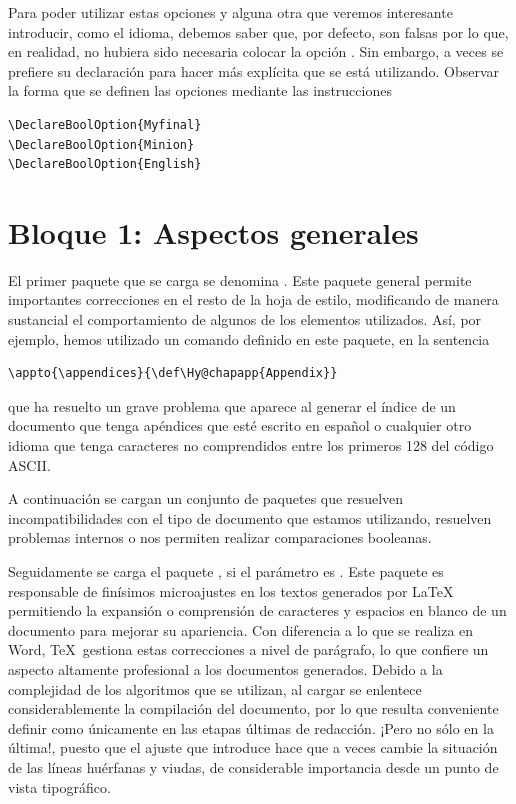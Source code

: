 Para poder utilizar estas opciones y alguna otra que veremos interesante introducir, como el idioma, debemos saber que, por defecto, son falsas por lo que, en realidad, no hubiera sido necesaria colocar la opción . Sin embargo, a veces se prefiere su declaración para hacer más explícita que se está utilizando. Observar la forma que se definen las opciones mediante las instrucciones

\begin{lstlisting}[rulecolor=\color{white}]
\DeclareBoolOption{Myfinal}
\DeclareBoolOption{Minion}
\DeclareBoolOption{English}
\end{lstlisting}

\section{Bloque 1: Aspectos generales}

El primer paquete que se carga se denomina . Este paquete general permite importantes correcciones en el resto de la hoja de estilo, modificando de manera sustancial el comportamiento de algunos de los elementos utilizados. Así, por ejemplo, hemos utilizado un comando definido en este paquete,  en la sentencia

\begin{lstlisting}[rulecolor=\color{white}]
\appto{\appendices}{\def\Hy@chapapp{Appendix}}
\end{lstlisting}
que ha resuelto un grave problema que aparece al generar el índice de un documento que tenga apéndices que esté escrito en español o cualquier otro idioma que tenga caracteres no comprendidos entre los primeros 128 del código ASCII.

A continuación se cargan un conjunto de paquetes que resuelven incompatibilidades con el tipo de documento que estamos utilizando, resuelven problemas internos o nos permiten realizar comparaciones booleanas. 

Seguidamente se carga el paquete , si el parámetro  es . Este paquete es responsable de finísimos microajustes en los textos generados por \LaTeX\, permitiendo la expansión o comprensión de caracteres y espacios en blanco de un documento para mejorar su apariencia. Con diferencia a lo que se realiza en Word, \TeX\ gestiona estas correcciones a nivel de parágrafo, lo que confiere un aspecto altamente profesional a los documentos generados. Debido a la complejidad de los algoritmos que se utilizan, al cargar  se enlentece considerablemente la compilación del documento, por lo que resulta conveniente definir  como  únicamente en las etapas últimas de redacción. ¡Pero no sólo en la última!, puesto que el ajuste que introduce hace que a veces cambie la situación de las líneas huérfanas y viudas, de considerable importancia desde un punto de vista tipográfico. 

